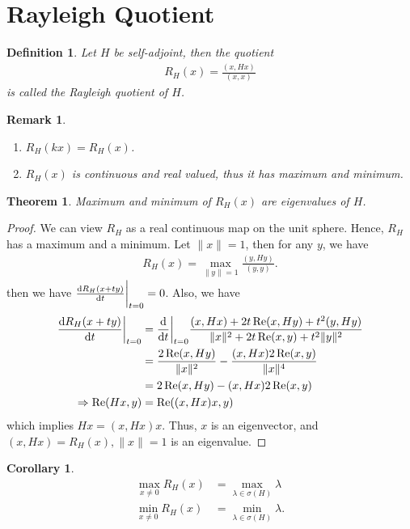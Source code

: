 \documentclass[11pt]{book}
\newtheorem{definition}{Definition}[section]
\newtheorem{theorem}{Theorem}[section]
\newtheorem{corollary}{Corollary}[theorem]
\newtheorem{remark}{Remark}[section]
\theoremstyle{definition}
\numberwithin{equation}{chapter}
\begin{document}
\medskip

\section{Rayleigh Quotient}

\begin{definition}
Let $H$ be self-adjoint, then the quotient
\begin{align*}
    R_H(x) = \frac{(x,Hx)}{(x,x)}
\end{align*}
is called the Rayleigh quotient of $H$.
\end{definition}

\begin{remark}
~\begin{enumerate}[label=(\arabic*)]
    \item $R_H(kx) = R_H(x)$.
    \item $R_H(x)$ is continuous and real valued, thus it has maximum and minimum.
\end{enumerate}
\end{remark}

\medskip

\begin{theorem}
Maximum and minimum of $R_H(x)$ are eigenvalues of $H$.
\end{theorem}
\begin{proof}
We can view $R_H$ as a real continuous map on the unit sphere. Hence, $R_H$ has a maximum and a minimum. Let $\|x\|=1$, then for any $y$, we have 
\begin{align*}
    R_H(x) = \max_{\|y\|=1} \frac{(y,Hy)}{(y,y)}.
\end{align*}
then we have $\dv{R_H(x+ty)}{t}\bigg|_{t = 0} = 0$. Also, we have
\begin{align*}
    \dv{R_H(x+ty)}{t}\bigg|_{t = 0} & = \dv{}{t}\bigg|_{t = 0} \frac{(x,Hx) + 2t\Re (x,Hy) + t^2 (y,Hy)}{\|x\|^2 + 2t \Re (x,y) + t^2 \|y\|^2} \\
    & = \frac{2\Re (x,Hy)}{\|x\|^2} - \frac{(x,Hx) 2 \Re (x,y)}{\|x\|^4} \\
    & = 2\Re (x,Hy) - (x,Hx) 2 \Re (x,y) \\
    \Rightarrow \Re (Hx,y) & =  \Re ((x,Hx)x,y)
\end{align*}
which implies $Hx = (x,Hx)x$. Thus, $x$ is an eigenvector, and $(x,Hx) = R_H(x), \|x\|=1$ is an eigenvalue.
\end{proof}

\medskip

\begin{corollary}
\begin{align*}
    \max_{x\neq 0}R_H(x) & = \max_{\lambda\in \sigma(H)}\lambda \\
    \min_{x\neq 0}R_H(x) & = \min_{\lambda\in \sigma(H)}\lambda.
\end{align*}
\end{corollary}
\end{document}
